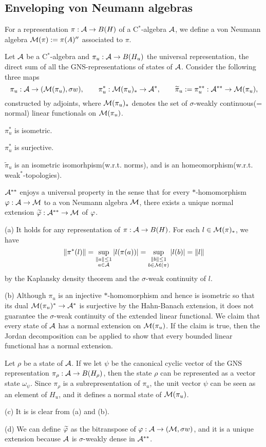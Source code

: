 \documentclass{../../../small}
\begin{document}
\subsection{Enveloping von Neumann algebras}
\begin{defn}
For a representation $\pi:\mathcal{A}\to B(H)$ of a C$^*$-algebra $\mathcal{A}$, we define a von Neumann algebra $\mathcal{M}(\pi):=\pi(A)''$ associated to $\pi$.
\end{defn}

\begin{thm}
Let $\mathcal{A}$ be a C$^*$-algebra and $\pi_u:\mathcal{A}\to B(H_u)$ the universal representation, the direct sum of all the GNS-representations of states of $\mathcal{A}$.
Consider the following three maps
\[\pi_u:\mathcal{A}\to(\mathcal{M}(\pi_u),\sigma w),\qquad\pi_u^*:\mathcal{M}(\pi_u)_*\to\mathcal{A}^*,\qquad\widetilde\pi_u:=\pi_u^{**}:\mathcal{A}^{**}\to\mathcal{M}(\pi_u),\]
constructed by adjoints, where $\mathcal{M}(\pi_u)_*$ denotes the set of $\sigma$-weakly continuous(= normal) linear functionals on $\mathcal{M}(\pi_u)$.
\begin{parts}
\item $\pi_u^*$ is isometric.
\item $\pi_u^*$ is surjective.
\item $\tilde\pi_u$ is an isometric isomorhpism(w.r.t. norms), and is an homeomorphism(w.r.t. weak$^*$-topologies).
\item $\mathcal{A}^{**}$ enjoys a universal property in the sense that for every $*$-homomorphism $\varphi:\mathcal{A}\to\mathcal{M}$ to a von Neumann algebra $\mathcal{M}$, there exists a unique normal extension $\widetilde{\varphi}:\mathcal{A}^{**}\to\mathcal{M}$ of $\varphi$.
\end{parts}
\end{thm}
\begin{pf}
(a)
It holds for any representation of $\pi:\mathcal{A}\to B(H)$.
For each $l\in\mathcal{M}(\pi)_*$, we have
\[\|\pi^*(l)\|=\sup_{\substack{\|a\|\le1\\a\in\mathcal{A}}}|l(\pi(a))|=\sup_{\substack{\|b\|\le1\\b\in\mathcal{M}(\pi)}}|l(b)|=\|l\|\] by the Kaplansky density theorem and the $\sigma$-weak continuity of $l$.

(b)
Although $\pi_u$ is an injective $*$-homomorphism and hence is isometric so that its dual $\mathcal{M}(\pi_u)^*\to\mathcal{A}^*$ is surjective by the Hahn-Banach extension, it does not guarantee the $\sigma$-weak continuity of the extended linear functional.
We claim that every state of $\mathcal{A}$ has a normal extension on $\mathcal{M}(\pi_u)$.
If the claim is true, then the Jordan decomposition can be applied to show that every bounded linear functional has a normal extension.

Let $\rho$ be a state of $\mathcal{A}$.
If we let $\psi$ be the canonical cyclic vector of the GNS representation $\pi_\rho:\mathcal{A}\to B(H_\rho)$, then the state $\rho$ can be represented as a vector state $\omega_\psi$.
Since $\pi_\rho$ is a subrepresentation of $\pi_u$, the unit vector $\psi$ can be seen as an element of $H_u$, and it defines a normal state of $\mathcal{M}(\pi_u)$.

(c)
It is is clear from (a) and (b).

(d)
We can define $\widetilde{\varphi}$ as the bitranspose of $\varphi:\mathcal{A}\to(\mathcal{M},\sigma w)$, and it is a unique extension because $\mathcal{A}$ is $\sigma$-weakly dense in $\mathcal{A}^{**}$.
\end{pf}
\end{document}
